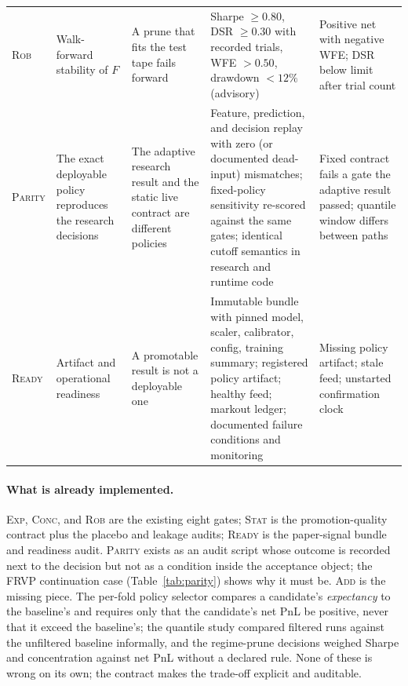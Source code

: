 \documentclass[10pt]{article}
\begin{document}
\begin{table}[t]
\begin{tabular}{@{}p{1.7cm}p{3.3cm}p{3.0cm}p{3.5cm}p{2.9cm}@{}}
\addlinespace
\textsc{Rob} & Walk-forward stability of $F$ & A prune that fits the test tape fails forward & Sharpe $\ge 0.80$, DSR $\ge 0.30$ with recorded trials, WFE $>0.50$, drawdown $<12\%$ (advisory) & Positive net with negative WFE; DSR below limit after trial count \\
\addlinespace
\textsc{Parity} & The exact deployable policy reproduces the research decisions & The adaptive research result and the static live contract are different policies & Feature, prediction, and decision replay with zero (or documented dead-input) mismatches; fixed-policy sensitivity re-scored against the same gates; identical cutoff semantics in research and runtime code & Fixed contract fails a gate the adaptive result passed; quantile window differs between paths \\
\addlinespace
\textsc{Ready} & Artifact and operational readiness & A promotable result is not a deployable one & Immutable bundle with pinned model, scaler, calibrator, config, training summary; registered policy artifact; healthy feed; markout ledger; documented failure conditions and monitoring & Missing policy artifact; stale feed; unstarted confirmation clock \\
\bottomrule
\end{tabular}
\end{table}

\paragraph{What is already implemented.} \textsc{Exp}, \textsc{Conc}, and \textsc{Rob} are the existing eight gates; \textsc{Stat} is the promotion-quality contract plus the placebo and leakage audits; \textsc{Ready} is the paper-signal bundle and readiness audit. \textsc{Parity} exists as an audit script whose outcome is recorded next to the decision but not as a condition inside the acceptance object; the FRVP continuation case (Table~\ref{tab:parity}) shows why it must be. \textsc{Add} is the missing piece. The per-fold policy selector compares a candidate's \emph{expectancy} to the baseline's and requires only that the candidate's net PnL be positive, never that it exceed the baseline's; the quantile study compared filtered runs against the unfiltered baseline informally, and the regime-prune decisions weighed Sharpe and concentration against net PnL without a declared rule. None of these is wrong on its own; the contract makes the trade-off explicit and auditable.
\end{document}
